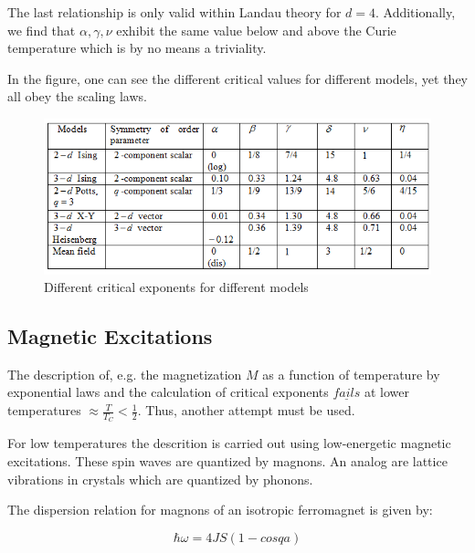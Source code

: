 \documentclass[10pt]{article} %
\begin{document}
The last relationship is only valid within Landau theory for $d = 4$. Additionally, we find that $\alpha, \gamma, \nu$ exhibit the same value below and above the Curie temperature which is by no means a triviality.

In the figure, one can see the different critical values for different models, yet they all obey the scaling laws.


\begin{figure}[H]
\begin{center}
\includegraphics[scale=0.8]{critexponents}
\caption{Different critical exponents for different models}
\end{center}
\end{figure}


\subsection{Magnetic Excitations}
The description of, e.g. the magnetization $M$ as a function of temperature by exponential laws and the calculation of critical exponents $\underline{fails}$ at lower temperatures $\approx \frac{T}{T_C} < \frac{1}{2}$. Thus, another attempt must be used. 

For low temperatures the descrition is carried out using low-energetic magnetic excitations. These spin waves are quantized by magnons. An analog are lattice vibrations in crystals which are quantized by phonons. 

The dispersion relation for magnons of an isotropic ferromagnet is given by:

\begin{equation}
\hbar \omega = 4JS(1 - cosqa)
\end{equation}
\end{document}
